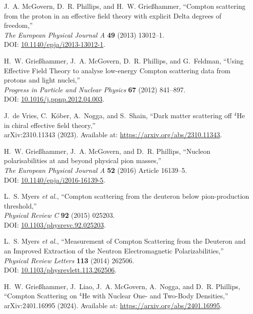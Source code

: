 \documentclass[12pt]{article}
\newcommand{\3}{\ss}
\numberwithin{equation}{section}
\begin{document}
\begin{thebibliography}{44}
J.~A. McGovern, D.~R. Phillips, and H.~W. Grießhammer, 
``Compton scattering from the proton in an effective field theory with explicit Delta degrees of freedom,''\\ 
\textit{The European Physical Journal A} \textbf{49} (2013) 13012–1.\\ 
DOI: \href{http://dx.doi.org/10.1140/epja/i2013-13012-1}{10.1140/epja/i2013-13012-1}.

H.~W. Grießhammer, J.~A. McGovern, D.~R. Phillips, and G.~Feldman, 
``Using Effective Field Theory to analyse low-energy Compton scattering data from protons and light nuclei,''\\ 
\textit{Progress in Particle and Nuclear Physics} \textbf{67} (2012) 841–897.\\ 
DOI: \href{http://dx.doi.org/10.1016/j.ppnp.2012.04.003}{10.1016/j.ppnp.2012.04.003}.

J.~de Vries, C.~Köber, A.~Nogga, and S.~Shain, 
``Dark matter scattering off ${}^4$He in chiral effective field theory,''\\ 
arXiv:2310.11343 (2023). Available at: \url{https://arxiv.org/abs/2310.11343}.

H.~W. Grießhammer, J.~A. McGovern, and D.~R. Phillips, 
``Nucleon polarisabilities at and beyond physical pion masses,''\\ 
\textit{The European Physical Journal A} \textbf{52} (2016) Article 16139–5.\\ 
DOI: \href{http://dx.doi.org/10.1140/epja/i2016-16139-5}{10.1140/epja/i2016-16139-5}.

L.~S. Myers \textit{et al.}, 
``Compton scattering from the deuteron below pion-production threshold,''\\ 
\textit{Physical Review C} \textbf{92} (2015) 025203.\\ 
DOI: \href{http://dx.doi.org/10.1103/physrevc.92.025203}{10.1103/physrevc.92.025203}.

L.~S. Myers \textit{et al.}, 
``Measurement of Compton Scattering from the Deuteron and an Improved Extraction of the Neutron Electromagnetic Polarizabilities,''\\ 
\textit{Physical Review Letters} \textbf{113} (2014) 262506.\\ 
DOI: \href{http://dx.doi.org/10.1103/physrevlett.113.262506}{10.1103/physrevlett.113.262506}.

H.~W. Grießhammer, J.~Liao, J.~A. McGovern, A.~Nogga, and D.~R. Phillips, 
``Compton Scattering on $^4$He with Nuclear One- and Two-Body Densities,''\\ 
arXiv:2401.16995 (2024). Available at: \url{https://arxiv.org/abs/2401.16995}.


\end{thebibliography}
\end{document}
